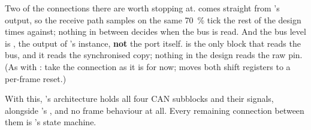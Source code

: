 Two of the connections there are worth stopping at.  comes straight from
's output, so the receive path samples on the same 70~\% tick the rest of the design
times against; nothing in between decides when the bus is read. And the bus level is
, the output of 's  instance, \textbf{not} the
 port itself.  is the only block that reads the bus, and it reads the
synchronised copy; nothing in the design reads the raw pin. (As with : take the
 connection as it is for now;  moves both shift registers to a
per-frame reset.)

With this, 's architecture holds all four CAN subblocks and their signals,
alongside 's , and no frame behaviour at all. Every remaining
connection between them is 's state machine.
